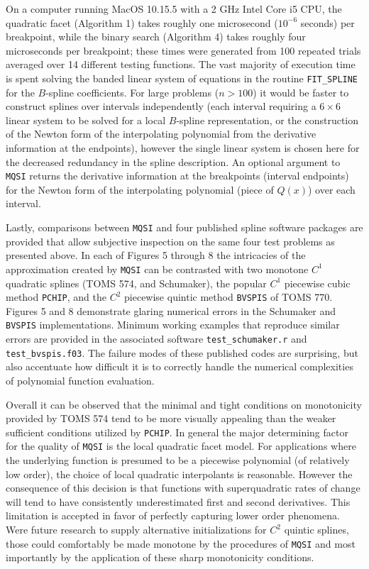 On a computer running MacOS 10.15.5 with a 2 GHz Intel Core i5 CPU, the
quadratic facet (Algorithm 1) takes roughly one microsecond ($10^{-6}$
seconds) per breakpoint, while the binary search (Algorithm 4) takes roughly
four microseconds per breakpoint; these times were generated from 100
repeated trials averaged over 14 different testing functions.  The vast
majority of execution time is spent solving the banded linear system of
equations in the routine {\tt FIT\_SPLINE} for the $B$-spline coefficients.
For large problems ($n > 100$) it would be faster to construct splines
over intervals independently (each interval requiring a $6 \times 6$ linear
system to be solved for a local $B$-spline representation, or the
construction of the Newton form of the interpolating polynomial from the
derivative information at the endpoints), however the single linear system
is chosen here for the decreased redundancy in the spline description. An
optional argument to {\tt MQSI} returns the derivative information at the
breakpoints (interval endpoints) for the Newton form of the interpolating
polynomial (piece of $Q(x)$) over each interval.

Lastly, comparisons between {\tt MQSI} and four published spline
software packages are provided that allow subjective inspection on the
same four test problems as presented above. In each of Figures 5
through 8 the intricacies of the approximation created by {\tt MQSI}
can be contrasted with two monotone $C^1$ quadratic splines (TOMS 574,
and Schumaker), the popular $C^1$ piecewise cubic method {\tt PCHIP},
and the $C^2$ piecewise quintic method {\tt BVSPIS} of TOMS
770. Figures 5 and 8 demonstrate glaring numerical errors in the
Schumaker and {\tt BVSPIS} implementations. Minimum working examples
that reproduce similar errors are provided in the associated software
{\tt test\_schumaker.r} and {\tt test\_bvspis.f03}. The failure modes
of these published codes are surprising, but also accentuate how
difficult it is to correctly handle the numerical complexities of
polynomial function evaluation.

Overall it can be observed that the minimal and tight conditions on
monotonicity provided by TOMS 574 tend to be more visually appealing
than the weaker sufficient conditions utilized by {\tt PCHIP}. In
general the major determining factor for the quality of {\tt MQSI} is
the local quadratic facet model. For applications where the underlying
function is presumed to be a piecewise polynomial (of relatively low
order), the choice of local quadratic interpolants is
reasonable. However the consequence of this decision is that functions
with superquadratic rates of change will tend to have consistently
underestimated first and second derivatives. This limitation is
accepted in favor of perfectly capturing lower order phenomena. Were
future research to supply alternative initializations for $C^2$
quintic splines, those could comfortably be made monotone by the
procedures of {\tt MQSI} and most importantly by the application of
these sharp monotonicity conditions.

